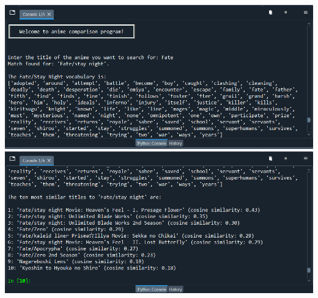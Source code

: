 \documentclass[12pt,a4]{article}
\begin{document}
\includegraphics[scale=0.9]{R1.png}
\includegraphics[scale=0.9]{R2.png}
\end{document}
